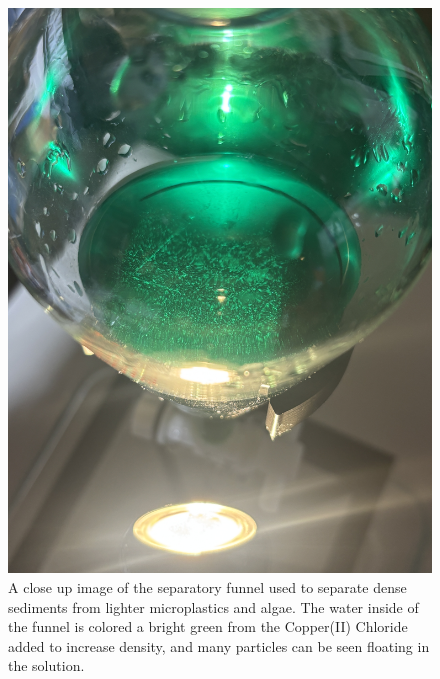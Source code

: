 \documentclass[fleqn,10pt]{SelfArx} %
\begin{document}
	\begin{figure}[h]
		\centering
		\includegraphics[angle=0,origin=c,width=1\linewidth]{Figures/SepFunnel}
		\caption[Separatory Funnel]{A close up image of the separatory funnel used to separate dense sediments from lighter microplastics and algae. The water inside of the funnel is colored a bright green from the Copper(II) Chloride added to increase density, and many particles can be seen floating in the solution.}
		\label{fig:SepFunnel}
		
	\end{figure}
\end{document}
